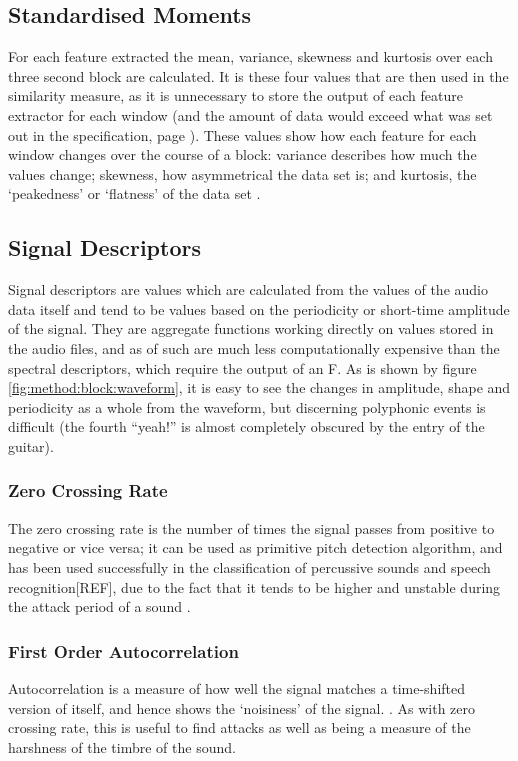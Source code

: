 \subsection{Standardised Moments}
For each feature extracted the mean, variance, skewness and kurtosis over each three second block are calculated. It is these four values that are then used in the similarity measure, as it is unnecessary to store the output of each feature extractor for each window (and the amount of data would exceed what was set out in the specification, page \pageref{text:spec:requirement:data}). These values show how each feature for each window changes over the course of a block: variance describes how much the values change; skewness, how asymmetrical the data set is; and kurtosis, the `peakedness' or `flatness' of the data set \citep{Siegrist2007}.
\subsection{Signal Descriptors}
Signal descriptors are values which are calculated from the values of the audio data itself and tend to be values based on the periodicity or short-time amplitude of the signal. They are aggregate functions working directly on values stored in the audio files, and as of such are much less computationally expensive than the spectral descriptors, which require the output of an F. As is shown by figure \ref{fig:method:block:waveform}, it is easy to see the changes in amplitude, shape and periodicity as a whole from the waveform, but discerning polyphonic events is difficult (the fourth ``yeah!'' is almost completely obscured by the entry of the guitar).
\subsubsection{Zero Crossing Rate}

The zero crossing rate is the number of times the signal passes from positive to negative or vice versa; it can be used as primitive pitch detection algorithm, and has been used successfully in the classification of percussive sounds \citep{Gouyon2000} and speech recognition[REF], due to the fact that it tends to be higher and unstable during the attack period of a sound \citep{Schwarz2004}.
\subsubsection{First Order Autocorrelation}

Autocorrelation is a measure of how well the signal matches a time-shifted version of itself, and hence shows the `noisiness' of the signal. \citep{Wikipedia2007}. As with zero crossing rate, this is useful to find attacks as well as being a measure of the harshness of the timbre of the sound.
